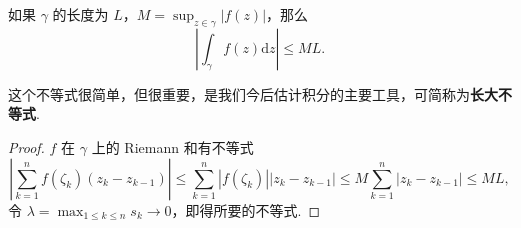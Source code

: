 \documentclass[../../main.tex]{subfiles}
\begin{document}
\begin{proposition}[长大不等式]\label{proposition:长大不等式}
如果 \( \gamma \) 的长度为 \( L \)，\( M = \sup_{z \in \gamma} |f(z)| \)，那么
\[
\left| \int_\gamma f(z)\mathrm{d}z \right| \leqslant ML. \tag{4}
\]
\end{proposition}
\begin{remark}
这个不等式很简单，但很重要，是我们今后估计积分的主要工具，可简称为\textbf{长大不等式}.
\end{remark}
\begin{proof}
\( f \) 在 \( \gamma \) 上的 Riemann 和有不等式
\[
\left| \sum_{k = 1}^n f(\zeta_k)(z_k - z_{k - 1}) \right| \leqslant \sum_{k = 1}^n |f(\zeta_k)| |z_k - z_{k - 1}|
\leqslant M \sum_{k = 1}^n |z_k - z_{k - 1}|
\leqslant ML,
\]
令 \( \lambda = \max_{1 \leqslant k \leqslant n} s_k \to 0 \)，即得所要的不等式.
\end{proof}
\end{document}

